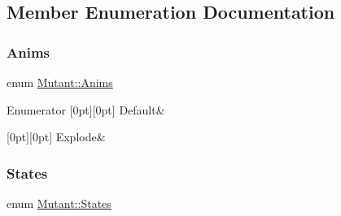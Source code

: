 \subsection{Member Enumeration Documentation}
\mbox{\label{class_mutant_a0b6d537f129ebc093f65e745a25eaf6a}} 
\subsubsection{\texorpdfstring{Anims}{Anims}}
{\footnotesize\ttfamily enum \hyperlink{class_mutant_a0b6d537f129ebc093f65e745a25eaf6a}{Mutant\+::\+Anims}}

\begin{DoxyEnumFields}{Enumerator}
[0pt][0pt]{}\mbox{\label{class_mutant_a0b6d537f129ebc093f65e745a25eaf6aa73a5536e612268909b171724bbb2a002}} 
Default&\\
\hline

[0pt][0pt]{}\mbox{\label{class_mutant_a0b6d537f129ebc093f65e745a25eaf6aa1883289f1eacf499d4142bf779202949}} 
Explode&\\
\hline

\end{DoxyEnumFields}
\mbox{\label{class_mutant_a508d3c9d254807091259a620bbf77209}} 
\subsubsection{\texorpdfstring{States}{States}}
{\footnotesize\ttfamily enum \hyperlink{class_mutant_a508d3c9d254807091259a620bbf77209}{Mutant\+::\+States}}

